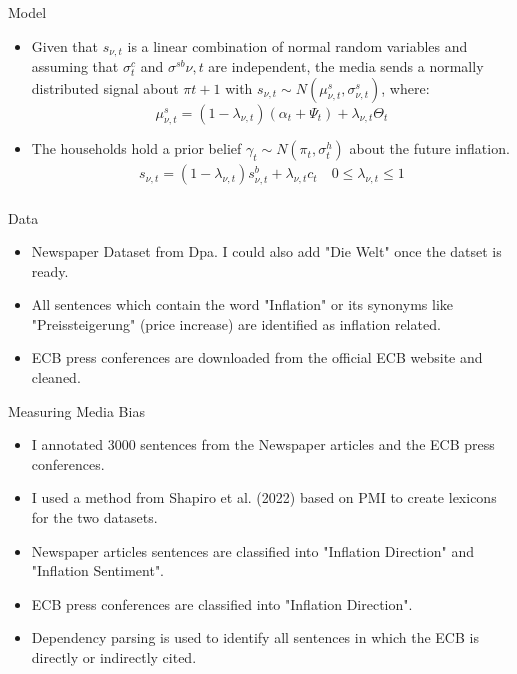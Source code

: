 \documentclass[aspectratio=169,xcolor=dvipsnames]{beamer}
\begin{document}
\begin{frame}{Model}

\begin{itemize}
	\item Given that $s_{\nu,t}$ is a linear combination of normal random variables and assuming that $\sigma^c_t$ and $\sigma^{sb}{\nu,t}$ are independent, the media sends a normally distributed signal about $\pi{t+1}$ with $s_{\nu,t} \sim N(\mu^s_{\nu,t}, \sigma^s_{\nu,t})$, where:
\begin{equation} 
\mu_{\nu,t}^s = (1-\lambda_{\nu,t}) (\alpha_t + \Psi_t) + \lambda_{\nu,t} \Theta_t 
\end{equation}
	\item The households hold a prior belief $\gamma_t \sim N(\pi_t, \sigma^h_t)$ about the future inflation.
	\begin{align*}
s_{\nu,t} = (1-\lambda_{\nu,t}) s^b_{\nu,t} + \lambda_{\nu,t} c_t \quad 0\leq \lambda_{\nu,t} \leq 1 \\
\end{align*}
\end{itemize}

\end{frame}


\begin{frame}{Data}

\begin{itemize}
	\item Newspaper Dataset from Dpa. I could also add "Die Welt" once the datset is ready.
	\item All sentences which contain the word "Inflation" or its synonyms like "Preissteigerung" (price increase) are identified as inflation related.
	\item ECB press conferences are downloaded from the official ECB website and cleaned.
\end{itemize}

\end{frame}


\begin{frame}{Measuring Media Bias}

\begin{itemize}
	\item I annotated 3000 sentences from the Newspaper articles and the ECB press conferences.
	\item I used a method from Shapiro et al. (2022) based on PMI to create lexicons for the two datasets.
	\item Newspaper articles sentences are classified into "Inflation Direction" and "Inflation Sentiment".
	\item ECB press conferences are classified into "Inflation Direction".
	\item Dependency parsing is used to identify all sentences in which the ECB is directly or indirectly cited.
\end{itemize}

\end{frame}
\end{document}
